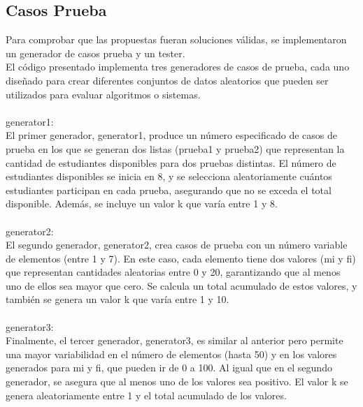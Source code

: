 \documentclass{article}
\begin{document}
\subsection{Casos Prueba}

Para comprobar que las propuestas fueran soluciones válidas, se implementaron un generador de casos prueba y un tester.
\\
El código presentado implementa tres generadores de casos de prueba, cada uno diseñado para crear diferentes conjuntos de datos aleatorios que pueden ser utilizados para evaluar algoritmos o sistemas.
\\
\\
generator1:
\\
El primer generador, generator1, produce un número especificado de casos de prueba en los que se generan dos listas (prueba1 y prueba2) que representan la cantidad de estudiantes disponibles para dos pruebas distintas. El número de estudiantes disponibles se inicia en 8, y se selecciona aleatoriamente cuántos estudiantes participan en cada prueba, asegurando que no se exceda el total disponible. Además, se incluye un valor k que varía entre 1 y 8.
\\
\\
generator2:
\\
El segundo generador, generator2, crea casos de prueba con un número variable de elementos (entre 1 y 7). En este caso, cada elemento tiene dos valores (mi y fi) que representan cantidades aleatorias entre 0 y 20, garantizando que al menos uno de ellos sea mayor que cero. Se calcula un total acumulado de estos valores, y también se genera un valor k que varía entre 1 y 10.
\\
\\
generator3:
\\
Finalmente, el tercer generador, generator3, es similar al anterior pero permite una mayor variabilidad en el número de elementos (hasta 50) y en los valores generados para mi y fi, que pueden ir de 0 a 100. Al igual que en el segundo generador, se asegura que al menos uno de los valores sea positivo. El valor k se genera aleatoriamente entre 1 y el total acumulado de los valores.
\end{document}
